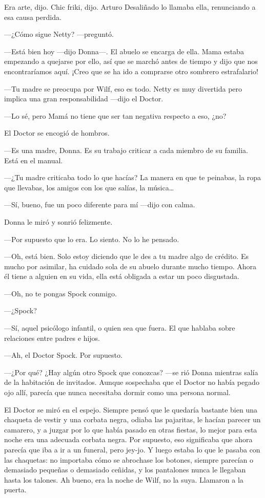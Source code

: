 Era arte, dijo. Chic friki, dijo. Arturo Desaliñado lo llamaba ella,
renunciando a esa causa perdida.

---¿Cómo sigue Netty? ---preguntó.

---Está bien hoy ---dijo Donna---. El abuelo se encarga de ella. Mama
estaba empezando a quejarse por ello, así que se marchó antes de tiempo
y dijo que nos encontraríamos aquí. ¡Creo que se ha ido a comprarse otro
sombrero estrafalario!

---Tu madre se preocupa por Wilf, eso es todo. Netty es muy divertida
pero implica una gran responsabilidad ---dijo el Doctor.

---Lo sé, pero Mamá no tiene que ser tan negativa respecto a eso, ¿no?

El Doctor se encogió de hombros.

---Es una madre, Donna. Es su trabajo criticar a cada miembro de su
familia. Está en el manual.

---¿Tu madre criticaba todo lo que hacías? La manera en que te
peinabas, la ropa que llevabas, los amigos con los que salías, la
música\ldots{}

---Sí, bueno, fue un poco diferente para mí ---dijo con calma.

Donna le miró y sonrió felizmente.

---Por supuesto que lo era. Lo siento. No lo he pensado.

---Oh, está bien. Solo estoy diciendo que le des a tu madre algo de
crédito. Es mucho por asimilar, ha cuidado sola de su abuelo durante
mucho tiempo. Ahora él tiene a alguien en su vida, ella está obligada a
estar un poco disgustada.

---Oh, no te pongas Spock conmigo.

---¿Spock?

---Sí, aquel psicólogo infantil, o quien sea que fuera. El que hablaba
sobre relaciones entre padres e hijos.

---Ah, el Doctor Spock. Por supuesto.

---¿Por qué? ¿Hay algún otro Spock que conozcas? ---se rió Donna
mientras salía de la habitación de invitados. Aunque sospechaba que el
Doctor no había pegado ojo allí, parecía que nunca necesitaba dormir
como una persona normal.

El Doctor se miró en el espejo. Siempre pensó que le quedaría bastante
bien una chaqueta de vestir y una corbata negra, odiaba las pajaritas,
le hacían parecer un camarero, y a juzgar por lo que había pasado en
otras fiestas, lo mejor para esta noche era una adecuada corbata negra.
Por supuesto, eso significaba que ahora parecía que iba a ir a un
funeral, pero jey-jo. Y luego estaba lo que le pasaba con las chaquetas:
no importaba cómo se abrochase los botones, siempre parecían o demasiado
pequeñas o demasiado ceñidas, y los pantalones nunca le llegaban hasta
los talones. Ah bueno, era la noche de Wilf, no la suya. Llamaron a la
puerta.

